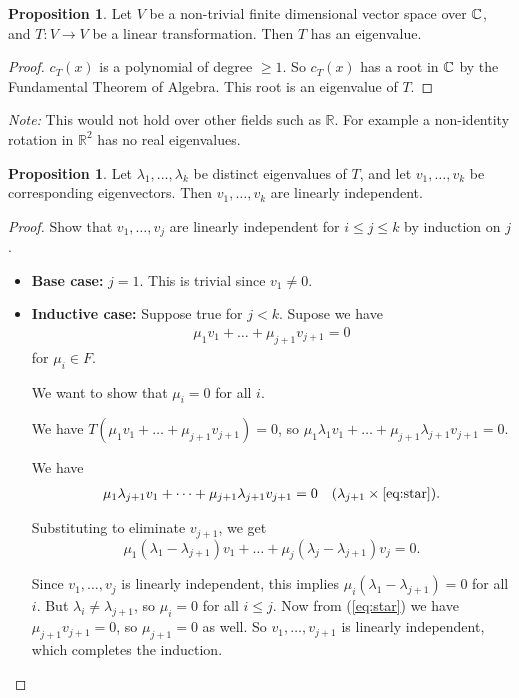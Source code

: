 \documentclass{article}
\theoremstyle{definition} \newtheorem*{definition}{Definition}
\newtheorem{proposition}[theorem]{Proposition}
\newcommand{\reals}{\mathbb{R}} \newcommand{\rationals}{\mathbb{Q}}
\begin{document}
\begin{proposition}
  Let $V$ be a non-trivial finite dimensional vector space over $\mathbb{C}$, and $T:V \rightarrow V$ be a  linear transformation. Then $T$ has an 
  eigenvalue.
\end{proposition}

\begin{proof}
  $c_T(x)$ is a polynomial of degree $\geq 1$. So $c_T(x)$ has  a root in
  $\mathbb{C}$ by the Fundamental Theorem of Algebra. This root is an
  eigenvalue of $T$.
\end{proof}

\emph{Note:} This would not hold over other fields such as $\reals$.
For example a non-identity rotation in $\reals^2$ has no real eigenvalues.\\

\begin{proposition}
  Let $\lambda_1 , \dots , \lambda_k$ be distinct eigenvalues of $T$, and
  let $v_1, \dots , v_k$ be corresponding eigenvectors. Then 
  $v_1, \dots , v_k$  are linearly independent.
  \label{prp:linindepeig}
\end{proposition}

\begin{proof}
  Show that $v_1, \dots , v_j$  are linearly independent for $i \leq j
  \leq k$  by induction on $j$.

  \begin{itemize}
    \item \textbf{Base case:} $j=1$. This is trivial since $v_1 \neq 0$.
    \item \textbf{Inductive case:} Suppose true for $j  < k$.
      Supose we have  
      \begin{align}
      \mu_1 v_1 + \dots + \mu_{j+1}v_{j+1}=0
      \tag{*}
      \label{eq:star}
      \end{align}
      for $\mu_i \in F$.

      We want to show that $\mu_i = 0$ for all $i$.

      We have $T(\mu_1 v_1 + \dots + \mu_{j+1}v_{j+1}) = 0$, so
      $\mu_1\lambda_1 v_1 + \dots + \mu_{j+1}\lambda_{j+1}v_{j+1} = 0$.

      We have
      \begin{align*}
      \mu_1 \lambda_{j+1} v_1 + \dots +
      \mu_{j+1}\lambda_{j+1}v_{j+1}=0 \quad 
      (\lambda_{j+1} \times \ref{eq:star}).
      \end{align*}

      Substituting to eliminate $v_{j+1}$, we get 
      $$\mu_1(\lambda_1 - \lambda_{j+1})v_1 + \dots + \mu_j(\lambda_j -
      \lambda_{j+1})v_j = 0.$$

      Since $v_1, \dots, v_j$ is linearly independent, this implies
      $\mu_i (\lambda_1 - \lambda_{j+1}) = 0 $ for all $i$. 
      But $\lambda_i \neq \lambda_{j+1}$, so $\mu_i = 0$ for all $i\leq j$.
      Now from (\ref{eq:star}) we have $\mu_{j+1}v_{j+1} = 0$, so 
      $\mu_{j+1}=0$ as well. So $v_1, \dots, v_{j+1}$ is linearly
      independent, which completes the induction.
  \end{itemize}
\end{proof}
\end{document}

